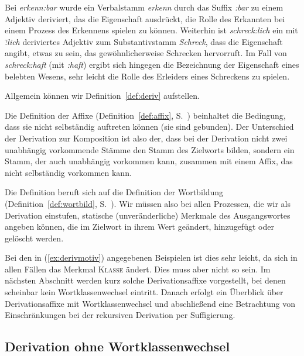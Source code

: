Bei \textit{erkenn:bar} wurde ein Verbalstamm \textit{erkenn} durch das Suffix \textit{:bar} zu einem Adjektiv deriviert, das die Eigenschaft ausdrückt, die Rolle des Erkannten bei einem Prozess des Erkennens spielen zu können.
Weiterhin ist \textit{schreck:lich} ein mit \textit{\~:lich} deriviertes Adjektiv zum Substantivstamm \textit{Schreck}, dass die Eigenschaft angibt, etwas zu sein, das gewöhnlicherweise Schrecken hervorruft.
Im Fall von \textit{schreck:haft} (mit \textit{:haft}) ergibt sich hingegen die Bezeichnung der Eigenschaft eines belebten Wesens, sehr leicht die Rolle des Erleiders eines Schreckens zu spielen.

Allgemein können wir Definition~\ref{def:deriv} aufstellen.


Die Definition der Affixe (Definition~\ref{def:affix}, S.~\pageref{def:affix}) beinhaltet die Bedingung, dass sie nicht selbständig auftreten können (sie sind gebunden).
Der Unterschied der Derivation zur Komposition ist also der, dass bei der Derivation nicht zwei unabhängig vorkommende Stämme den Stamm des Zielworts bilden, sondern ein Stamm, der auch unabhängig vorkommen kann, zusammen mit einem Affix, das nicht selbständig vorkommen kann.

Die Definition beruft sich auf die Definition der Wortbildung (Definition~\ref{def:wortbild}, S.~\pageref{def:wortbild}).
Wir müssen also bei allen Prozessen, die wir als Derivation einstufen, statische (unveränderliche) Merkmale des Ausgangswortes angeben können, die im Zielwort in ihrem Wert geändert, hinzugefügt oder gelöscht werden.

Bei den in (\ref{ex:derivmotiv}) angegebenen Beispielen ist dies sehr leicht, da sich in allen Fällen das Merkmal \textsc{Klasse} ändert.
Dies muss aber nicht so sein.
Im nächsten Abschnitt werden kurz solche Derivationsaffixe vorgestellt, bei denen scheinbar kein Wortklassenwechsel eintritt.
Danach erfolgt ein Überblick über Derivationsaffixe mit Wortklassenwechsel und abschließend eine Betrachtung von Einschränkungen bei der rekursiven Derivation per Suffigierung.

\subsection{Derivation ohne Wortklassenwechsel}

